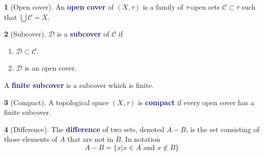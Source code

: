 \documentclass[11pt]{article}
\numberwithin{equation}{section}
\newcommand{\navy}[1]{\textcolor{MidnightBlue}{\bf #1}}
\theoremstyle{plain}
\theoremstyle{definition}
\newtheorem{definition}{\color{MidnightBlue}{\textbf{Definition}}}[section]
\def\ss{\subset}
\newcommand{\1}{\mathbbm 1}
\def\t{\tau}
\newcommand{\cC}{\mathcal C}
\newcommand{\dD}{\mathcal D}
\begin{document}
\begin{definition}[Open cover]
An \navy{open cover} of $(X,\t)$ is a family of $\t$-open sets $\cC \ss \t$ such that $\bigcup \cC = X$.
\end{definition}

\begin{definition}[Subcover]
$\dD$ is a \navy{subcover} of $\cC$ if
\begin{enumerate}
\item $\dD \ss \cC$.
\item $\dD$ is an open cover.
\end{enumerate}
A \navy{finite subcover} is a subcover which is finite.
\end{definition}

\begin{definition}[Compact]
A topological space $(X,\t)$ is \navy{compact} if every open cover has a finite subcover.
\end{definition}

\begin{definition}[Difference]
The \navy{difference} of two sets, denoted $A-B$, is the set consisting of those elements of $A$ that are not in $B$. In notation
\begin{equation*}
A - B = \{x | x \in A \text{ and } x \not\in B\}
\end{equation*}
\end{definition}
\end{document}
